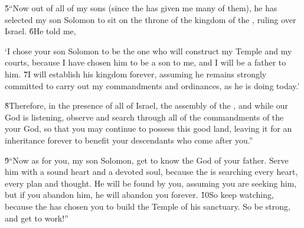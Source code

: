 \v{5}``Now out of all of my sons (since the  has given me many of them), he has selected my son Solomon to sit on the throne of the kingdom of the , ruling over Israel. \v{6}He told me,

\begin{poetry}
\poeml `I chose your son Solomon to be the one who will construct my Temple and my courts, because I have chosen him to be a son to me, and I will be a father to him. \v{7}I will establish his kingdom forever, assuming he remains strongly committed to carry out my commandments and ordinances, as he is doing today.'
\end{poetry}

\v{8}Therefore, in the presence of all of Israel, the assembly of the , and while our God is listening, observe and search through all of the commandments of the  your God, so that you may continue to possess this good land, leaving it for an inheritance forever to benefit your descendants who come after you.''

\v{9}``Now as for you, my son Solomon, get to know the God of your father. Serve him with a sound heart and a devoted soul, because the  is searching every heart, every plan and thought. He will be found by you, assuming you are seeking him, but if you abandon him, he will abandon you forever. \v{10}So keep watching, because the  has chosen you to build the Temple of his sanctuary. So be strong, and get to work!''

